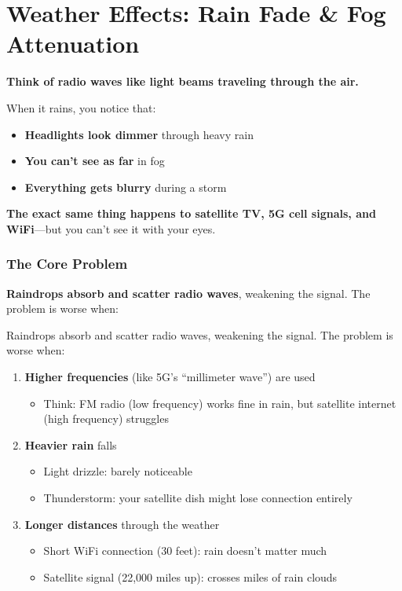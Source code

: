 \chapter{Weather Effects: Rain Fade \& Fog Attenuation}
\label{ch:weather-effects}

\begin{nontechnical}
\textbf{Think of radio waves like light beams traveling through the air.}

When it rains, you notice that:
\begin{itemize}
\item \textbf{Headlights look dimmer} through heavy rain
\item \textbf{You can't see as far} in fog
\item \textbf{Everything gets blurry} during a storm
\end{itemize}

\textbf{The exact same thing happens to satellite TV, 5G cell signals, and WiFi}---but you can't see it with your eyes.

\subsection*{The Core Problem}

\textbf{Raindrops absorb and scatter radio waves}, weakening the signal. The problem is worse when:

Raindrops absorb and scatter radio waves, weakening the signal. The problem is worse when:
\begin{enumerate}
\item \textbf{Higher frequencies} (like 5G's ``millimeter wave'') are used
  \begin{itemize}
  \item Think: FM radio (low frequency) works fine in rain, but satellite internet (high frequency) struggles
  \end{itemize}
\item \textbf{Heavier rain} falls
  \begin{itemize}
  \item Light drizzle: barely noticeable
  \item Thunderstorm: your satellite dish might lose connection entirely
  \end{itemize}
\item \textbf{Longer distances} through the weather
  \begin{itemize}
  \item Short WiFi connection (30 feet): rain doesn't matter much
  \item Satellite signal (22,000 miles up): crosses miles of rain clouds
  \end{itemize}
\end{enumerate}


\end{nontechnical}
